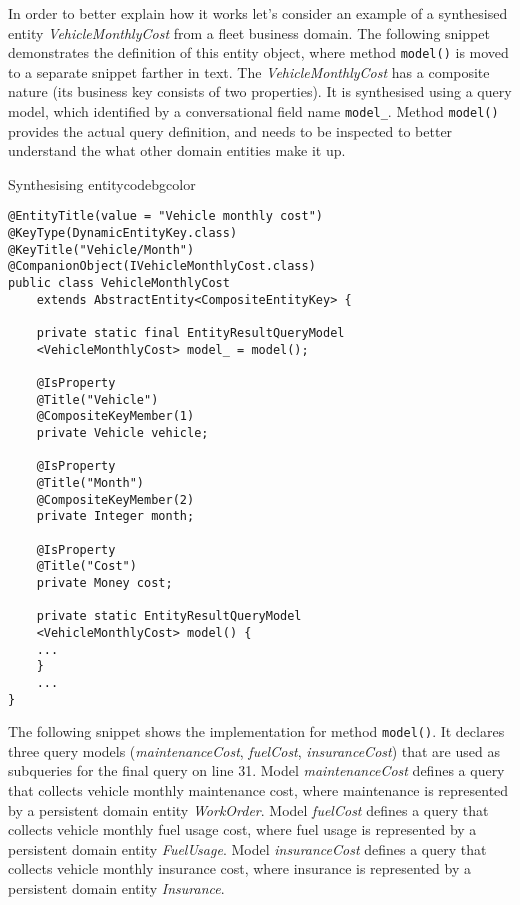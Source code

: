   In order to better explain how it works let's consider an example of a synthesised entity \emph{VehicleMonthlyCost} from a fleet business domain.
  The following snippet demonstrates the definition of this entity object, where method \texttt{model()} is moved to a separate snippet farther in text.
  The \emph{VehicleMonthlyCost} has a composite nature (its business key consists of two properties).
  It is synthesised using a query model, which identified by a conversational field name \texttt{model\_}.
  Method \texttt{model()} provides the actual query definition, and needs to be inspected to better understand the what other domain entities make it up.

  \begin{code}{Synthesising entity}{\label{lst:eql3}}{codebgcolor}
    \begin{lstlisting}[numbersep=10pt]
@EntityTitle(value = "Vehicle monthly cost")
@KeyType(DynamicEntityKey.class)
@KeyTitle("Vehicle/Month")
@CompanionObject(IVehicleMonthlyCost.class)
public class VehicleMonthlyCost 
    extends AbstractEntity<CompositeEntityKey> {
    
    private static final EntityResultQueryModel
    <VehicleMonthlyCost> model_ = model();

    @IsProperty
    @Title("Vehicle")
    @CompositeKeyMember(1)
    private Vehicle vehicle;

    @IsProperty    
    @Title("Month")
    @CompositeKeyMember(2)
    private Integer month;

    @IsProperty    
    @Title("Cost")
    private Money cost;

    private static EntityResultQueryModel
    <VehicleMonthlyCost> model() {
	...
    }  
    ...
}
    \end{lstlisting}   
  \end{code}  
  
  \medskip
  \medskip
  The following snippet shows the implementation for method \texttt{model()}.
  It declares three query models (\emph{maintenanceCost}, \emph{fuelCost}, \emph{insuranceCost}) that are used as subqueries for the final query on line 31.
  Model \emph{maintenanceCost} defines a query that collects vehicle monthly maintenance cost, where maintenance is represented by a persistent domain entity \emph{WorkOrder}.
  Model \emph{fuelCost} defines a query that collects vehicle monthly fuel usage cost, where fuel usage is represented by a persistent domain entity \emph{FuelUsage}.
  Model \emph{insuranceCost} defines a query that collects vehicle monthly insurance cost, where insurance is represented by a persistent domain entity \emph{Insurance}.
  
